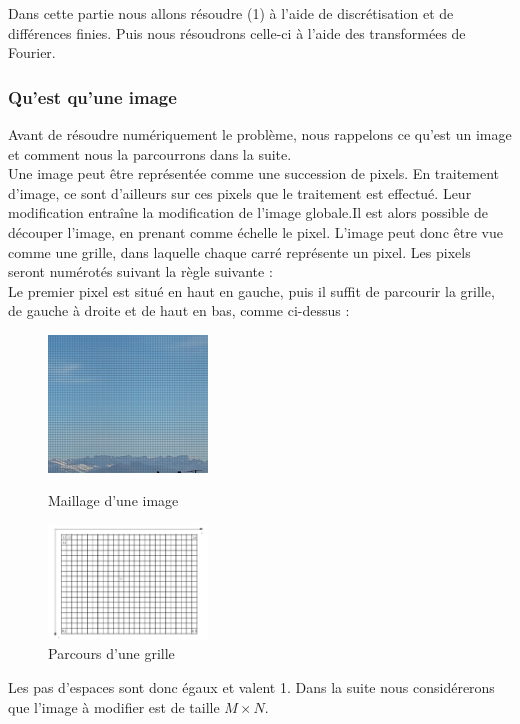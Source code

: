 Dans cette partie nous allons résoudre (1) à l'aide de discrétisation et de différences finies. Puis nous résoudrons celle-ci à l'aide des transformées de Fourier. \\
\subsubsection{Qu'est qu'une image}
Avant de résoudre numériquement le problème, nous rappelons ce qu'est un image et comment nous la  parcourrons dans la suite.\\
Une image peut être représentée comme une succession de pixels. En traitement d'image, ce sont d'ailleurs sur ces pixels que le traitement est effectué. Leur modification entraîne la modification de l'image globale.Il est alors possible de découper l'image, en prenant comme échelle le pixel. L'image peut donc être vue comme une grille, dans laquelle chaque carré représente un pixel. Les pixels seront numérotés suivant la règle suivante : \\

Le premier pixel est situé en haut en gauche, puis il suffit de parcourir la grille, de gauche à droite et de haut en bas, comme ci-dessus :  
\begin{figure}[!h]
   \begin{minipage}{0.5\textwidth}
     \centering
     \includegraphics[width = 120pt]{Images/Montagne_grille.jpg}
        \caption{Maillage d'une image}
      \end{minipage}\hfill
   \begin{minipage}{0.5\textwidth}
     \centering
     \includegraphics[width = 120pt]{Images/grille.png}
	\caption{Parcours d'une grille}
      \end{minipage}\hfill
\end{figure}

Les pas d'espaces sont donc égaux et valent 1. Dans la suite nous considérerons que l'image à modifier est de taille $M \times N$.

